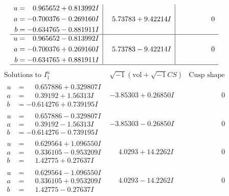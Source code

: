 \documentclass[1p]{elsarticle_modified}
\theoremstyle{definition}
\newcommand{\I}{\sqrt{-1}}
\begin{document}
$$\begin{array}{c|c|c}
\begin{aligned}
u &= \phantom{-}0.965652 + 0.813992 I \\
a &= -0.700376 - 0.269160 I \\
b &= -0.634765 - 0.881911 I\end{aligned}
 & \phantom{-}5.73783 + 9.42214 I & \phantom{-0.000000 } 0 \\ \hline\begin{aligned}
u &= \phantom{-}0.965652 - 0.813992 I \\
a &= -0.700376 + 0.269160 I \\
b &= -0.634765 + 0.881911 I\end{aligned}
 & \phantom{-}5.73783 - 9.42214 I & \phantom{-0.000000 } 0\\
 \hline 
 \end{array}$$\newpage$$\begin{array}{c|c|c}  
\text{Solutions to }I^u_{1}& \I (\text{vol} + \sqrt{-1}CS) & \text{Cusp shape}\\
 \hline 
\begin{aligned}
u &= \phantom{-}0.657886 + 0.329807 I \\
a &= \phantom{-}0.39192 + 1.56313 I \\
b &= -0.614276 + 0.739195 I\end{aligned}
 & -3.85303 + 0.26850 I & \phantom{-0.000000 } 0 \\ \hline\begin{aligned}
u &= \phantom{-}0.657886 - 0.329807 I \\
a &= \phantom{-}0.39192 - 1.56313 I \\
b &= -0.614276 - 0.739195 I\end{aligned}
 & -3.85303 - 0.26850 I & \phantom{-0.000000 } 0 \\ \hline\begin{aligned}
u &= \phantom{-}0.629564 + 1.096550 I \\
a &= \phantom{-}0.336105 - 0.953209 I \\
b &= \phantom{-}1.42775 + 0.27637 I\end{aligned}
 & \phantom{-}4.0293 + 14.2262 I & \phantom{-0.000000 } 0 \\ \hline\begin{aligned}
u &= \phantom{-}0.629564 - 1.096550 I \\
a &= \phantom{-}0.336105 + 0.953209 I \\
b &= \phantom{-}1.42775 - 0.27637 I\end{aligned}
 & \phantom{-}4.0293 - 14.2262 I & \phantom{-0.000000 } 0 \\ \hline\begin{aligned}

\end{aligned}
\end{array}$$
\end{document}
